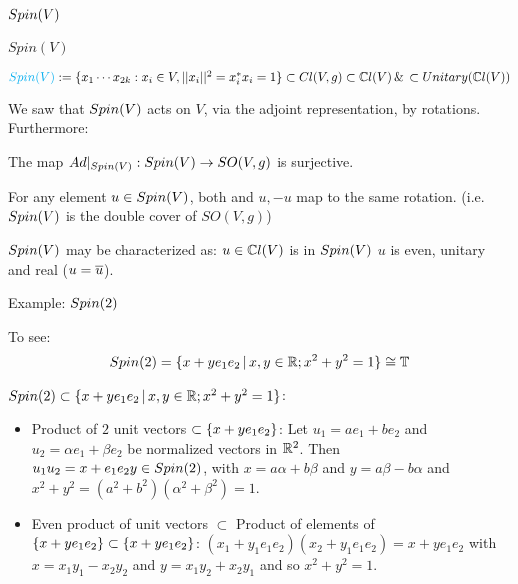 \subsection{$Spin(V)$}

\begin{frame}{$Spin(V)$} %

    \begin{Definition} $\textcolor{cyan}{Spin(V)} := \{x_1 \cdots x_{2k}: x_i \in V, ||x_i||^2 = x_i^* x_i = 1\} \subset Cl(V, g) \subset \mathbb C l(V) \, \&\, \subset Unitary(\mathbb C l(V))$
    \end{Definition}
    
    We saw that $Spin(V)$ acts on $V$, via the adjoint representation, by rotations. Furthermore:
    
    \begin{proposition}
    The map $Ad|_{Spin(V)}: Spin(V) \to SO(V, g)$ is surjective.
    
    For any element $u \in Spin(V)$, both and $u, -u$ map to the same rotation. (i.e. $Spin(V)$ is the double cover of $SO(V, g)$)
    \end{proposition}
    
    $Spin(V)$ may be characterized as: $u \in \mathbb C l(V)$ is in $Spin(V)$ \iff $u$ is even, unitary and real ($u = \overline{u}$).
\end{frame}

\begin{frame}{Example: $Spin(2)$} %
    
    To see: \[Spin(2) = \{x + y e_1 e_2 \,|\, x, y \in \mathbb R;  x^2 + y^2 = 1\} \cong \mathbb T\]
    
    $Spin(2) \subset \{x + y e_1 e_2 \,|\, x, y \in \mathbb R;  x^2 + y^2 = 1\}$:
        \begin{itemize}
            
        \item Product of $2$ unit vectors $\subset \{x + y e_1 e_2\}$: Let $u_1 = a e_1 + b e_2$ and $u_2 = \alpha e_1 + \beta e_2$ be normalized vectors in $\mathbb R^2$. Then $u_1 u_2 = x + e_1 e_2 y \in Spin(2)$, with $x = a \alpha + b \beta$ and $y = a \beta  - b \alpha$ and $x^2 + y^2 = (a^2 + b^2)(\alpha^2 + \beta^2) = 1$.
        
        \item Even product of unit vectors $\subset$ Product of elements of $\{x + y e_1 e_2\} \subset \{x + y e_1 e_2\}$: $(x_1 + y_1 e_1 e_2)(x_2 + y_1 e_1 e_2) = x + y e_1 e_2$ with $x = x_1 y_1 - x_2 y_2$ and $y = x_1 y_2 + x_2 y_1$ and so $x^2 + y^2 = 1$.
            
        \end{itemize}
    
\end{frame}

